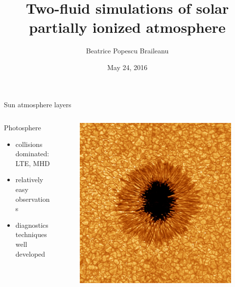 \documentclass{beamer}
\begin{document}
\title[Two-fluid simulations]  
{Two-fluid simulations of solar partially ionized atmosphere }
\author[]{Beatrice Popescu Braileanu }
\date{May 24, 2016}

\begin{frame}
\maketitle
\end{frame}

\begin{frame}[t]{Sun atmosphere layers}
\vspace*{-22pt}
\begin{columns}[b]
    \begin{column}{0.6\textwidth}
		Photosphere
        \begin{itemize}
					\item collisions dominated: LTE, MHD 
					\item	relatively easy observations 
					\item	diagnostics techniques well developed 
        \end{itemize}
    \end{column}
    \begin{column}{0.5\textwidth}
			\begin{figure}[t]
			 \includegraphics[scale=0.08]{phot.jpg}
			\end{figure}
    \end{column}
\end{columns}


\end{frame}
\end{document}
